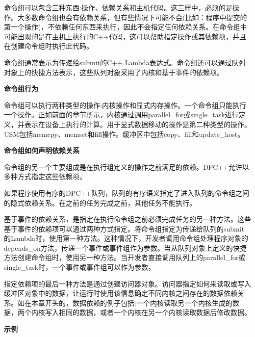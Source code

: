 命令组可以包含三种东西:操作、依赖关系和主机代码。这三样中，必须的是操作。大多数命令组也会有依赖关系，但有些情况下可能不会(比如：程序中提交的第一个操作)，不依赖任何东西来执行，因此不会指定任何依赖关系。在命令组中可能出现的是在主机上执行的C++代码，这可以帮助指定操作或其依赖项，并且在创建命令组时执行此代码。\par

命令组通常表示为传递给submit的C++ Lambda表达式。命令组还可以通过队列对象上的快捷方法表示，这些队列对象采用了内核和基于事件的依赖项。\par

\hspace*{\fill} \par %
\textbf{命令组行为}

命令组可以执行两种类型的操作:内核操作和显式内存操作。一个命令组只能执行一个操作。正如前面的章节所示，内核通过调用parallel\_for或single\_task进行定义，并表示在设备上执行的计算。用于显式数据移动的操作是第二种类型的操作。USM包括memcpy、memset和fill操作。缓冲区中包括copy、fill和update\_host。\par

\hspace*{\fill} \par %
\textbf{命令组如何声明依赖关系}

命令组的另一个主要组成是在执行组定义的操作之前满足的依赖。DPC++允许以多种方式指定这些依赖项。\par

如果程序使用有序的DPC++队列，队列的有序语义指定了进入队列的命令组之间的隐式依赖关系。在之前的任务完成之前，其他任务不能执行。\par

基于事件的依赖关系，是指定在执行命令组之前必须完成任务的另一种方法。这些基于事件的依赖项可以通过两种方式指定。将命令组指定为传递给队列的submit的Lambda时，使用第一种方法。这种情况下，开发者调用命令组处理程序对象的depends\_on方法，传递一个事件或事件组作为参数。当从队列对象上定义的快捷方法创建命令组时，使用另一种方法。当开发者直接调用队列上的parallel\_for或single\_task时，一个事件或事件组可以作为参数。\par

指定依赖项的最后一种方法是通过创建访问器对象。访问器指定如何来读取或写入缓冲区对象中的数据，让运行时使用该信息确定不同内核之间存在的数据依赖关系。如在本章开头的，数据依赖的例子包括:一个内核读取另一个内核生成的数据，两个内核写入相同的数据，或者一个内核在另一个内核读取数据后修改数据。\par

\hspace*{\fill} \par %
\textbf{示例}

